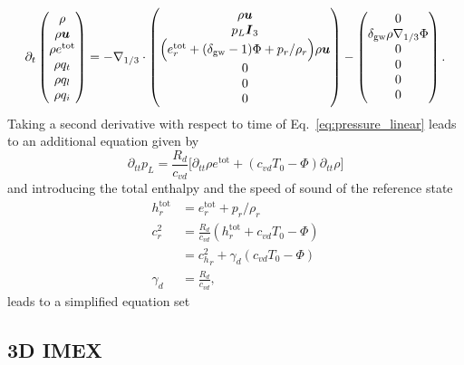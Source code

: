 \documentclass{report}
\numberwithin{equation}{section}
\begin{document}
\begin{equation}\label{e:IMEX_implicit}
\partial_t\begin{pmatrix}
\rho \\
\rho \vec{u} \\
\rho e^\mathrm{tot} \\
\rho q_t \\
\rho q_l \\
\rho q_i
\end{pmatrix} = 
 -\nabla_{1/3} \cdot \begin{pmatrix}
 \rho \vec{u} \\
 p_L \vec{I}_3  \\
 \Bigl(e^{\mathrm{tot}}_r  + (\delta_{\mathrm{gw}}-1)\Phi + p_r/\rho_r \Bigr) \rho \vec{u}\\
 0\\
 0\\
 0
\end{pmatrix}
-
\begin{pmatrix}
0 \\
\delta_{\mathrm{gw}} \rho \nabla_{1/3} \Phi \\
0\\
0\\
0\\
0
\end{pmatrix}.
\end{equation}
Taking a second derivative with respect to time of Eq.~\eqref{eq:pressure_linear} leads to an additional equation given by
\begin{equation}
    \partial_{tt} p_L = \frac{R_d}{c_{vd}} \bigl[  \partial_{tt} \rho e^{\mathrm{tot}} + \left(c_{vd} T_0 - \Phi\right) \partial_{tt} \rho \bigr] 
\end{equation}
and introducing the total enthalpy and the speed of sound of the reference state
\begin{subequations}
\begin{align}
    h^\mathrm{tot}_r &= e^\mathrm{tot}_r + p_r/\rho_r \\
    c^2_r &= \frac{R_d}{c_{vd}}\left(h^\mathrm{tot}_r + c_{vd}T_0 - \Phi\right)\\
    &= {c_h^2}_r + \gamma_d\left(c_{vd}T_0 - \Phi\right)\\
    \gamma_d &= \frac{R_d}{c_{vd}},
\end{align}
\end{subequations}
leads to a simplified equation set

\subsection{3D IMEX}
\end{document}
